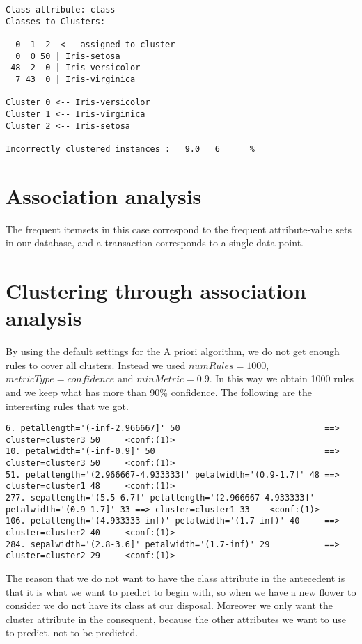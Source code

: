 \documentclass[]{article}
\begin{document}
\begin{lstlisting}
Class attribute: class
Classes to Clusters:

  0  1  2  <-- assigned to cluster
  0  0 50 | Iris-setosa
 48  2  0 | Iris-versicolor
  7 43  0 | Iris-virginica

Cluster 0 <-- Iris-versicolor
Cluster 1 <-- Iris-virginica
Cluster 2 <-- Iris-setosa

Incorrectly clustered instances :	9.0	  6      %
\end{lstlisting}

\section{Association analysis}
The frequent itemsets in this case correspond to the frequent attribute-value sets in our database, and a transaction corresponds to a single data point.

\section{Clustering through association analysis}
By using the default settings for the A priori algorithm, we do not get enough rules to cover all clusters. Instead we used $numRules=1000$, $metricType=confidence$ and $minMetric=0.9$. In this way we obtain 1000 rules and we keep what has more than 90\% confidence. The following are the interesting rules that we got.
\begin{lstlisting}[breaklines=true]
6. petallength='(-inf-2.966667]' 50 							==> cluster=cluster3 50 	<conf:(1)> 
10. petalwidth='(-inf-0.9]' 50 									==> cluster=cluster3 50  	<conf:(1)> 
51. petallength='(2.966667-4.933333]' petalwidth='(0.9-1.7]' 48 ==> cluster=cluster1 48  	<conf:(1)> 
277. sepallength='(5.5-6.7]' petallength='(2.966667-4.933333]' petalwidth='(0.9-1.7]' 33 ==> cluster=cluster1 33    <conf:(1)> 
106. petallength='(4.933333-inf)' petalwidth='(1.7-inf)' 40 	==> cluster=cluster2 40     <conf:(1)> 
284. sepalwidth='(2.8-3.6]' petalwidth='(1.7-inf)' 29 			==> cluster=cluster2 29   	<conf:(1)> 
\end{lstlisting}
The reason that we do not want to have the class attribute in the antecedent is that it is what we want to predict to begin with, so when we have a new flower to consider we do not have its class at our disposal. Moreover we only want the cluster attribute in the consequent, because the other attributes we want to use to predict, not to be predicted.
\end{document}
